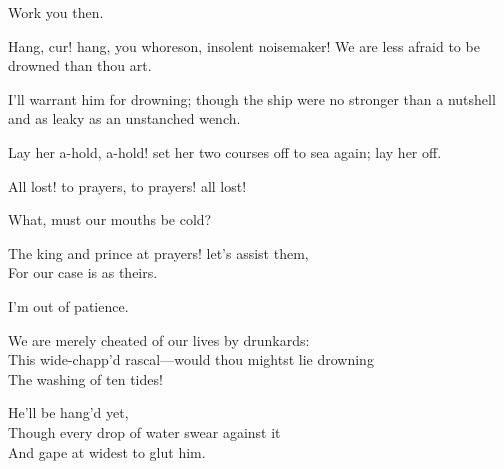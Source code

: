 \begin{prose_speech}[Boatswain] Work you then.
	\end{prose_speech}

\begin{prose_speech}[Antonio] Hang, cur! hang, you whoreson, insolent noisemaker! We are less afraid to be drowned than thou art.
\end{prose_speech}

\begin{prose_speech}[Gonzalo] I'll warrant him for drowning; though the ship were no stronger than a nutshell and as leaky as an unstanched wench.
\end{prose_speech}

\begin{prose_speech}[Boatswain] Lay her a-hold, a-hold! set her two courses off to sea again; lay her off.
\end{prose_speech}


\begin{prose_speech}[Mariners] All lost! to prayers, to prayers! all lost!
	\end{prose_speech}


\begin{prose_speech}[Boatswain] What, must our mouths be cold?
	\end{prose_speech}

\begin{verse_speech}[Gonzalo] The king and prince at prayers! let's assist them,\\ For our case is as theirs.
\end{verse_speech}

\begin{verse_speech}[Sebastian] I'm out of patience.\end{verse_speech}

\begin{verse_speech}[Antonio] We are merely cheated of our lives by drunkards:\\
This wide-chapp'd rascal—would thou mightst lie drowning\\
The washing of ten tides!\end{verse_speech}


\begin{verse_speech}[Gonzalo] He'll be hang'd yet,\\
Though every drop of water swear against it\\
And gape at widest to glut him.
\end{verse_speech}


